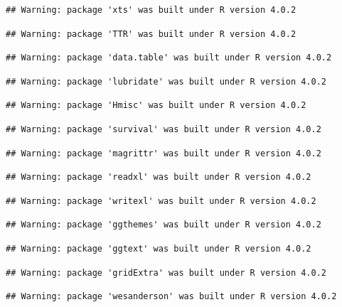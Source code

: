 \documentclass[
]{article}
\begin{document}
\begin{verbatim}
## Warning: package 'xts' was built under R version 4.0.2
\end{verbatim}

\begin{verbatim}
## Warning: package 'TTR' was built under R version 4.0.2
\end{verbatim}

\begin{verbatim}
## Warning: package 'data.table' was built under R version 4.0.2
\end{verbatim}

\begin{verbatim}
## Warning: package 'lubridate' was built under R version 4.0.2
\end{verbatim}

\begin{verbatim}
## Warning: package 'Hmisc' was built under R version 4.0.2
\end{verbatim}

\begin{verbatim}
## Warning: package 'survival' was built under R version 4.0.2
\end{verbatim}

\begin{verbatim}
## Warning: package 'magrittr' was built under R version 4.0.2
\end{verbatim}

\begin{verbatim}
## Warning: package 'readxl' was built under R version 4.0.2
\end{verbatim}

\begin{verbatim}
## Warning: package 'writexl' was built under R version 4.0.2
\end{verbatim}

\begin{verbatim}
## Warning: package 'ggthemes' was built under R version 4.0.2
\end{verbatim}

\begin{verbatim}
## Warning: package 'ggtext' was built under R version 4.0.2
\end{verbatim}

\begin{verbatim}
## Warning: package 'gridExtra' was built under R version 4.0.2
\end{verbatim}

\begin{verbatim}
## Warning: package 'wesanderson' was built under R version 4.0.2
\end{verbatim}
\end{document}
